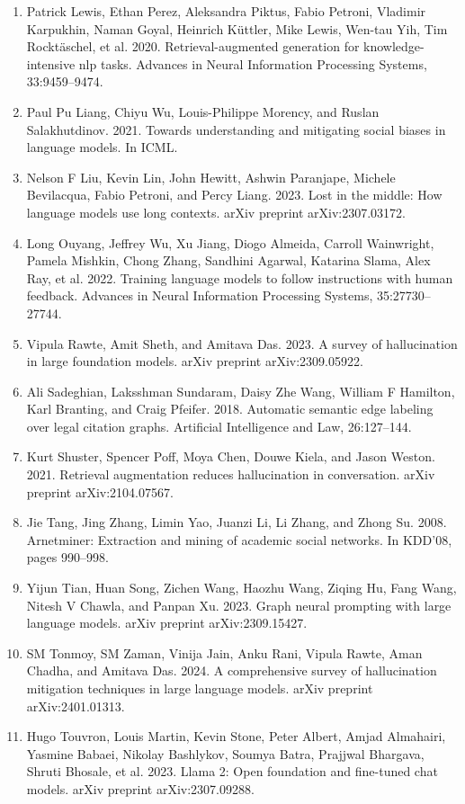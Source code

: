 \documentclass[11pt,UTF8,fontset=fandol]{ctexart}
\begin{document}
\begin{enumerate}[leftmargin=2em]
\item Patrick Lewis, Ethan Perez, Aleksandra Piktus, Fabio Petroni, Vladimir Karpukhin, Naman Goyal, Heinrich K\"uttler, Mike Lewis, Wen-tau Yih, Tim Rockt\"aschel, et al. 2020. Retrieval-augmented generation for knowledge-intensive nlp tasks. Advances in Neural Information Processing Systems, 33:9459--9474.
\item Paul Pu Liang, Chiyu Wu, Louis-Philippe Morency, and Ruslan Salakhutdinov. 2021. Towards understanding and mitigating social biases in language models. In ICML.
\item Nelson F Liu, Kevin Lin, John Hewitt, Ashwin Paranjape, Michele Bevilacqua, Fabio Petroni, and Percy Liang. 2023. Lost in the middle: How language models use long contexts. arXiv preprint arXiv:2307.03172.
\item Long Ouyang, Jeffrey Wu, Xu Jiang, Diogo Almeida, Carroll Wainwright, Pamela Mishkin, Chong Zhang, Sandhini Agarwal, Katarina Slama, Alex Ray, et al. 2022. Training language models to follow instructions with human feedback. Advances in Neural Information Processing Systems, 35:27730--27744.
\item Vipula Rawte, Amit Sheth, and Amitava Das. 2023. A survey of hallucination in large foundation models. arXiv preprint arXiv:2309.05922.
\item Ali Sadeghian, Laksshman Sundaram, Daisy Zhe Wang, William F Hamilton, Karl Branting, and Craig Pfeifer. 2018. Automatic semantic edge labeling over legal citation graphs. Artificial Intelligence and Law, 26:127--144.
\item Kurt Shuster, Spencer Poff, Moya Chen, Douwe Kiela, and Jason Weston. 2021. Retrieval augmentation reduces hallucination in conversation. arXiv preprint arXiv:2104.07567.
\item Jie Tang, Jing Zhang, Limin Yao, Juanzi Li, Li Zhang, and Zhong Su. 2008. Arnetminer: Extraction and mining of academic social networks. In KDD'08, pages 990--998.
\item Yijun Tian, Huan Song, Zichen Wang, Haozhu Wang, Ziqing Hu, Fang Wang, Nitesh V Chawla, and Panpan Xu. 2023. Graph neural prompting with large language models. arXiv preprint arXiv:2309.15427.
\item SM Tonmoy, SM Zaman, Vinija Jain, Anku Rani, Vipula Rawte, Aman Chadha, and Amitava Das. 2024. A comprehensive survey of hallucination mitigation techniques in large language models. arXiv preprint arXiv:2401.01313.
\item Hugo Touvron, Louis Martin, Kevin Stone, Peter Albert, Amjad Almahairi, Yasmine Babaei, Nikolay Bashlykov, Soumya Batra, Prajjwal Bhargava, Shruti Bhosale, et al. 2023. Llama 2: Open foundation and fine-tuned chat models. arXiv preprint arXiv:2307.09288.

\end{enumerate}
\end{document}
